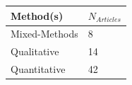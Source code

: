 \documentclass[]{tufte-handout}
\begin{document}
\begin{longtable}[]{@{}ll@{}}
\toprule
\begin{minipage}[b]{0.21\columnwidth}\raggedright\strut
Method(s)\strut
\end{minipage} & \begin{minipage}[b]{0.21\columnwidth}\raggedright\strut
\(N_{Articles}\)\strut
\end{minipage}\tabularnewline
\midrule
\endhead
\begin{minipage}[t]{0.21\columnwidth}\raggedright\strut
Mixed-Methods\strut
\end{minipage} & \begin{minipage}[t]{0.21\columnwidth}\raggedright\strut
8\strut
\end{minipage}\tabularnewline
\begin{minipage}[t]{0.21\columnwidth}\raggedright\strut
Qualitative\strut
\end{minipage} & \begin{minipage}[t]{0.21\columnwidth}\raggedright\strut
14\strut
\end{minipage}\tabularnewline
\begin{minipage}[t]{0.21\columnwidth}\raggedright\strut
Quantitative\strut
\end{minipage} & \begin{minipage}[t]{0.21\columnwidth}\raggedright\strut
42\strut
\end{minipage}\tabularnewline
\bottomrule
\end{longtable}
\end{document}
